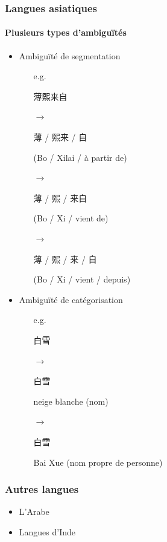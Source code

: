 \documentclass[12pt,aspectratio=43,dvipsnames,table]{beamer}
\begin{document}
\begin{frame}
    \frametitle{Langues asiatiques}
    \framesubtitle{Plusieurs types d'ambiguïtés~\cite{wang:approche:recital13}}
     \begin{itemize} \itemsep10pt
        \item Ambiguïté de segmentation
        \begin{itemize} 
          \item[e.g.] \begin{CJK}{UTF8}{min}薄熙来自\end{CJK}
          \item[$\to$] \begin{CJK}{UTF8}{min}薄 / 熙来 / 自\end{CJK} (Bo / Xilai / à partir de)
          \item[$\to$] \begin{CJK}{UTF8}{min}薄 / 熙 / 来自\end{CJK} (Bo / Xi / vient de)
          \item[$\to$] \begin{CJK}{UTF8}{min}薄 / 熙 / 来 / 自\end{CJK} (Bo / Xi / vient / depuis)
        \end{itemize}
       \item Ambiguïté de catégorisation
       \begin{itemize} 
          \item[e.g.] \begin{CJK}{UTF8}{min}白雪\end{CJK}
          \item[$\to$] \begin{CJK}{UTF8}{min}白雪\end{CJK} neige blanche (nom)
          \item[$\to$] \begin{CJK}{UTF8}{min}白雪\end{CJK} Bai Xue (nom propre de personne)
        \end{itemize}
    \end{itemize}
\end{frame}


\begin{frame}
    \frametitle{Autres langues}
    \begin{itemize} \itemsep10pt
        \item L'Arabe \\



        \item Langues d'Inde
    \end{itemize}
\end{frame}
\end{document}
